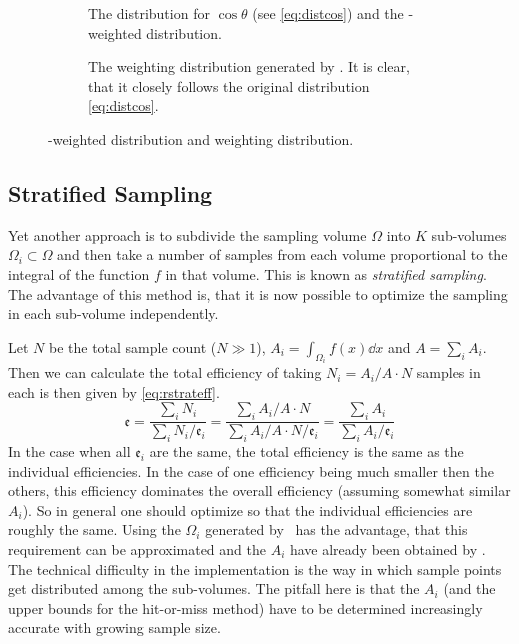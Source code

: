 \begin{figure}[ht]
  \centering
  \begin{subfigure}{.49\textwidth}
    \caption[The distribution for \(\cos\theta\), derived from the
    differential cross-section and the \vegas-weighted
    distribution]{\label{fig:vegasdist} The distribution for
      \(\cos\theta\) (see \cref{eq:distcos}) and the \vegas-weighted
      distribution.}
  \end{subfigure}
  \begin{subfigure}{.49\textwidth}
    \caption[The weighting distribution generated by
    \vegas.]{\label{fig:vegasrho} The weighting distribution generated
      by \vegas. It is clear, that it closely follows the original
      distribution \cref{eq:distcos}.}
  \end{subfigure}
  \caption{\label{fig:vegas-weighting} \vegas-weighted distribution
    and weighting distribution.}
\end{figure}
%


\subsection{Stratified Sampling}
\label{sec:stratsamp-real}

Yet another approach is to subdivide the sampling volume \(\Omega\)
into \(K\) sub-volumes \(\Omega_i\subset\Omega\) and then take a
number of samples from each volume proportional to the integral of the
function \(f\) in that volume. This is known as \emph{stratified
  sampling}. The advantage of this method is, that it is now possible
to optimize the sampling in each sub-volume independently.

Let \(N\) be the total sample count (\(N\gg 1\)),
\(A_i = \int_{\Omega_i}f(x)\dd{x}\) and \(A=\sum_iA_i\).
Then we can calculate the total efficiency of taking \(N_i=A_i/A \cdot N\)
samples in each is then given by \cref{eq:rstrateff}.
%
\begin{equation}
  \label{eq:rstrateff}
  \mathfrak{e} = \frac{\sum_i N_i}{\sum_i N_i/\mathfrak{e}_i} =
  \frac{\sum_i A_i/A\cdot N}{\sum_i A_i/A\cdot N/ \mathfrak{e}_i} = \frac{\sum_i A_i}{\sum_i A_i/\mathfrak{e}_i}
\end{equation}
%
In the case when all \(\mathfrak{e}_i\) are the same, the total
efficiency is the same as the individual efficiencies. In the case of
one efficiency being much smaller then the others, this efficiency
dominates the overall efficiency (assuming somewhat similar
\(A_i\)). So in general one should optimize so that the individual
efficiencies are roughly the same. Using the \(\Omega_i\) generated by
\vegas\ has the advantage, that this requirement can be approximated
and the \(A_i\) have already been obtained by \vegas. The technical
difficulty in the implementation is the way in which sample points get
distributed among the sub-volumes. The pitfall here is that the
\(A_i\) (and the upper bounds for the hit-or-miss method) have to be
determined increasingly accurate with growing sample size.

